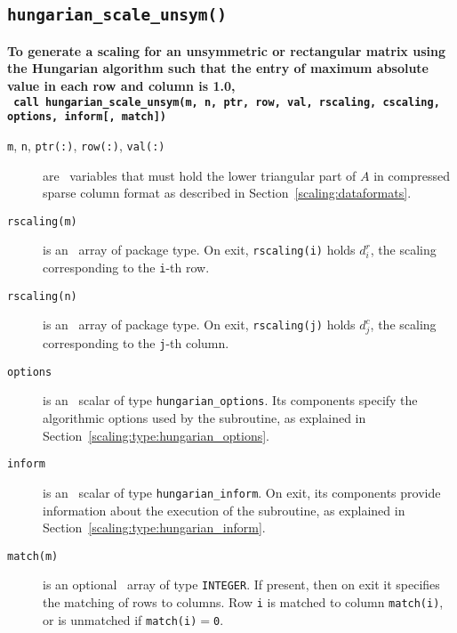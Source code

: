 \subsection{\texttt{hungarian\_scale\_unsym()}}

\textbf{\noindent
   To generate a scaling for an unsymmetric or rectangular matrix using the Hungarian algorithm such that the entry of maximum absolute value in each row and column is 1.0,
   \vspace*{0.3cm} \\
   \texttt{ \hspace*{0.2cm}
      call hungarian\_scale\_unsym(m, n, ptr, row, val, rscaling, cscaling, options, inform[, match])
   }
   \vspace{0.3cm}
}

\begin{description}

\item[\texttt{m}, \texttt{n}, \texttt{ptr(:)}, \texttt{row(:)}, \texttt{val(:)}] are \intentin\ variables that must hold the lower triangular part of $A$ in compressed sparse column format as described in Section~\ref{scaling:dataformats}.

\item[\texttt{rscaling(m)}] is an \intentout\ array of package type. On exit,
\texttt{rscaling(i)} holds $d^r_i$, the scaling corresponding to the
\texttt{i}-th row.

\item[\texttt{rscaling(n)}] is an \intentout\ array of package type. On exit,
\texttt{rscaling(j)} holds $d^c_j$, the scaling corresponding to the
\texttt{j}-th column.

\item[\texttt{options}] is an \intentin\ scalar of type \texttt{hungarian\_options}. Its components specify the algorithmic options used by the subroutine, as explained in Section~\ref{scaling:type:hungarian_options}.

\item[\texttt{inform}] is an \intentout\ scalar of type \texttt{hungarian\_inform}. On exit, its components provide information about the execution of the subroutine, as explained in Section~\ref{scaling:type:hungarian_inform}.

\item[\texttt{match(m)}] is an optional \intentout\ array of type {\tt INTEGER}.
If present, then on exit it specifies the matching of rows to
columns. Row \texttt{i} is matched to column \texttt{match(i)}, or is unmatched
if \texttt{match(i)}$=$\texttt{0}.

\end{description}

